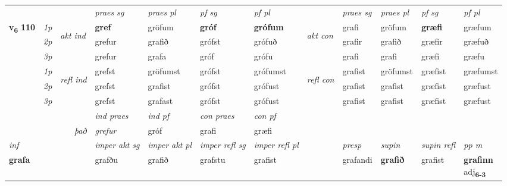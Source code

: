 \begin{longtable}[l]{X>{\footnotesize\itshape}llXXXXlXXXX}
\midrule

 & &   & \textit{praes sg}  & \textit{praes pl}    & \textit{ pf sg} & \textit{pf pl} & & \textit{praes sg}  & \textit{praes pl}    & \textit{pf sg} & \textit{pf pl }  \\ \cmidrule{4-7} \cmidrule{9-12}
 \multirow{2}{*}{{{\textbf{v{\textsubscript{6}}} \Large{\textbf{110}}}}}  & 1p & \multirow{3}{*}{\begin{turn}{90}\textit{akt ind}\end{turn}} & \textbf{gref} & gröfum & \textbf{gróf} & \textbf{grófum} & \multirow{3}{*}{\begin{turn}{90}\textit{akt con}\end{turn}} &grafi & gröfum & \textbf{græfi} & græfum\\*
 & 2p &  &  grefur  & grafið & grófst & grófuð & & grafir & grafið & græfir & græfuð \\*
 & 3p &  & grefur & grafa & gróf & grófu & & grafi & grafi& græfi & græfu \\*
\cmidrule{4-7} \cmidrule{9-12}
 & 1p & \multirow{3}{*}{\begin{turn}{90}\textit{refl ind}\end{turn}}  & grefst & gröfumst & grófst & grófumst & \multirow{3}{*}{\begin{turn}{90}\textit{refl con}\end{turn}}  &grafist & gröfumst & græfist & græfumst \\*
 & 2p &  & grefst & grafist & grófst & grófust & &grafist & grafist & græfist & græfust \\*
 & 3p  & & grefst & grafast & grófst & grófust & & grafist & grafist& græfist & græfust \\*
\cmidrule{4-7} \cmidrule{9-12}

   && &  \textit{ind praes} & \textit{ind pf} & \textit{con praes} & \textit{con pf} \\*
\multicolumn{3}{r}{\textit{það}} & grefur & gróf & grafi & græfi \\*

\cmidrule{4-7}
   {\textit{inf}} & &  & \textit{imper akt sg} & \textit{imper akt pl} & \textit{imper refl sg} & \textit{imper refl pl} && \textit{presp} & \textit{supin} & \textit{supin refl} & \textit{pp m} \\*
  {\textbf{grafa}} & && grafðu  & grafið & grafstu & grafist && grafandi &  \textbf{grafið} & grafist & \specialcell{\textbf{grafinn} \\ adj\textbf{\textsubscript{6-3}}} \\*


\end{longtable}
